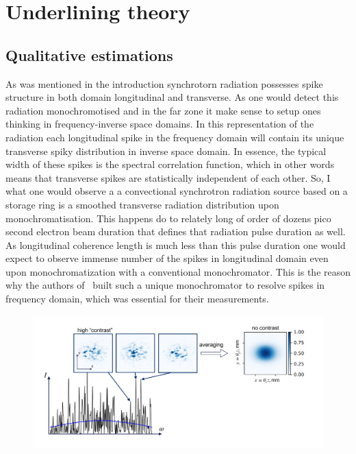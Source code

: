 \section{Underlining theory}

\subsection{Qualitative estimations}
    As was mentioned in the introduction synchrotorn radiation possesses spike structure in both domain longitudinal and transverse. As one would detect this radiation  monochromotised and in the far zone it make sense to setup ones thinking in frequency-inverse space domains. In this representation of the radiation each longitudinal spike in the frequency domain will contain its unique transverse spiky distribution in inverse space domain. In essence, the typical width of these spikes is the spectral correlation function, which in other words means that transverse spikes are statistically independent of each other. So, I what one would observe a a convectional synchrotron radiation source based on a storage ring is a smoothed transverse radiation distribution upon monochromatisation. This happens do to relately long of order of dozens pico second electron beam duration that defines that radiation pulse duration as well. As longitudinal coherence length is much less than this pulse duration one would expect to observe immense number of the spikes in longitudinal domain even upon monochromatization with a conventional monochromator. This is the reason why the authors of~\cite{} built such a unique monochromator to resolve spikes in frequency domain, which was essential for their measurements.

    \begin{figure}[h!]
    	\centering
        \includegraphics[width=0.99\linewidth]{content/images/ebeam_size_with_SR/SR_spikes_many.pdf}
        \captionsetup{justification=centering}
        \caption{}
        \label{Fig:SR_spikes_many}
    \end{figure}

